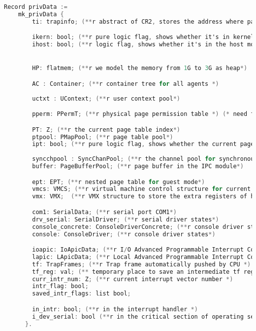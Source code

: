\begin{lstlisting}[language=C]
  Record privData :=
    mk_privData {
        ti: trapinfo; (**r abstract of CR2, stores the address where page fault happens*)

        ikern: bool; (**r pure logic flag, shows whether it's in kernel mode or not*)
        ihost: bool; (**r logic flag, shows whether it's in the host mode or not*)         


        HP: flatmem; (**r we model the memory from 1G to 3G as heap*)

        AC : Container; (**r container tree for all agents *)
        
        uctxt : UContext; (**r user context pool*)

        pperm: PPermT; (**r physical page permission table *) (* need fancy merging *)

        PT: Z; (**r the current page table index*) 
        ptpool: PMapPool; (**r page table pool*)
        ipt: bool; (**r pure logic flag, shows whether the current page map is the kernel's page map*)
        
        syncchpool : SyncChanPool; (**r the channel pool for synchronous IPC*)
        buffer: PageBufferPool; (**r page buffer in the IPC module*)

        ept: EPT; (**r nested page table for guest mode*)
        vmcs: VMCS; (**r virtual machine control structure for current VM *)
        vmx: VMX;  (**r VMX structure to store the extra registers of host *) 

        com1: SerialData; (**r serial port COM1*)
        drv_serial: SerialDriver; (**r serial driver states*)
        console_concrete: ConsoleDriverConcrete; (**r console driver states concrete implementation*)
        console: ConsoleDriver; (**r console driver states*)

        ioapic: IoApicData; (**r I/O Advanced Programmable Interrupt Controller *)
        lapic: LApicData; (**r Local Advanced Programmable Interrupt Controller *)
        tf: TrapFrames; (**r Trap frame automatically pushed by CPU *)
        tf_reg: val; (** temporary place to save an intermediate tf regiter *) 
        curr_intr_num: Z; (**r current interrupt vector number *)
        intr_flag: bool; 
        saved_intr_flags: list bool;

        in_intr: bool; (**r in the interrupt handler *)
        i_dev_serial: bool (**r in the critical section of operating serial *)
      }.
\end{lstlisting}

